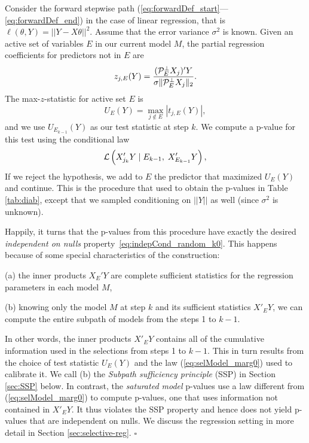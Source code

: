 \documentclass{article}
\begin{document}
\medskip
\begin{example}
Consider the forward stepwise path (\ref{eq:forwardDef_start}---\ref{eq:forwardDef_end}) in the case of linear regression, that is 
$\ell(\theta,Y)=||Y-X\theta||^2$.  Assume that the error variance $\sigma^2$ is known.
 Given an active set of variables $E$ in our current model $M$, the partial regression coefficients for predictors not in $E$ are
\begin{equation}
  z_{j,E}(Y) = \frac{(\mathcal{P}_E^\perp X_j)'Y}
  {\sigma\|\mathcal{P}_{E}^\perp X_j\|_2}.
\end{equation}
The max-$z$-statistic for active set $E$  is
\begin{equation}\label{eq:maxT}
  U_E(Y) = \max_{j \notin E} \left|t_{j,E}(Y)\right|,
\end{equation}
and we use $U_{E_{k-1}}(Y)$ as our test statistic at step $k$. We compute a p-value for this test
using the conditional law 
\begin{equation}\label{eq:selModel_marg0}
\mathcal{L}\left(X_{j_k}'Y \mid E_{k-1}, \; X_{E_{k-1}}'Y\right),
\end{equation}
If we reject the hypothesis, we add to $E$ the predictor that maximized $U_E(Y)$ and continue.
This is the procedure that used to obtain the p-values in Table \ref{tab:diab}, except that we sampled
conditioning on $||Y||$ as well (since $\sigma^2$ is unknown).

Happily,  it turns that the  p-values from this procedure have exactly the desired {\it independent on nulls} property~\eqref{eq:indepCond_random_k0}.
This happens because of some special characteristics of the construction: 
\begin{description}
\item{(a)}  the inner products $X_E'Y$ are complete sufficient statistics for the regression
parameters in each model $M$,
\item{(b)} knowing only the  model $M$ at step $k$ and its sufficient statistics $X'_EY$, we can compute the entire subpath
of models from the steps 1 to $k-1$. 
\end{description}
 In other words, the inner products $X'_EY$ contains  all of the cumulative information used in the selections from
steps 1 to $k-1$. This in turn results from    the choice  of test statistic $U_E(Y)$  and the law (\ref{eq:selModel_marg0}) used to calibrate it.
We call (b)  the {\it Subpath sufficiency principle} (SSP) in Section \ref{sec:SSP}  below.
In contrast, the {\it saturated model} p-values use a law different from (\ref{eq:selModel_marg0}) to compute p-values, one that uses
information not contained in $X'_EY$. It thus violates the SSP property and hence does not yield p-values that are independent on nulls.
We discuss the regression setting in more detail in Section \ref{sec:selective-reg}.  $\square$
\end{example}
\end{document}
